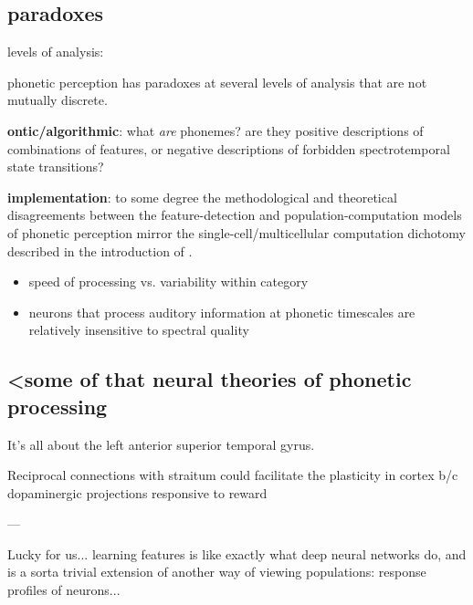 \begin{multicols}{2}
\begin{itemize}
\end{itemize}

\subsection{paradoxes}

levels of analysis:

phonetic perception has paradoxes at several levels of analysis that are not mutually discrete.

\textbf{ontic/algorithmic}: what \textit{are} phonemes? are they positive descriptions of combinations of features, or negative descriptions of forbidden spectrotemporal state transitions?

\textbf{implementation}: to some degree the methodological and theoretical disagreements between the feature-detection and population-computation models of phonetic perception mirror the single-cell/multicellular computation dichotomy described in the introduction of \cite{dubreuilComplementaryRolesDimensionality2020}. 

\begin{itemize}
	\item speed of processing vs. variability within category
	\item neurons that process auditory information at phonetic timescales are relatively insensitive to spectral quality \cite{norman-haignereHierarchicalIntegrationMultiple2020}
\end{itemize}

\subsection{<some of that neural theories of phonetic processing}

It's all about the left anterior superior temporal gyrus. 



Reciprocal connections with straitum could facilitate the plasticity in cortex b/c dopaminergic projections responsive to reward \cite{fengRoleHumanAuditory2018}


---

Lucky for us... learning features is like exactly what deep neural networks do, and is a sorta trivial extension of another way of viewing populations: response profiles of neurons...


\end{multicols}
